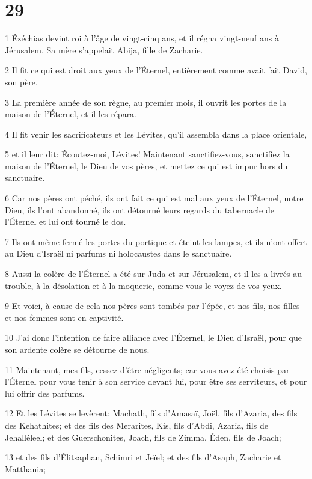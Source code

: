 \chapter{29}

\par 1 Ézéchias devint roi à l'âge de vingt-cinq ans, et il régna vingt-neuf ans à Jérusalem. Sa mère s'appelait Abija, fille de Zacharie.
\par 2 Il fit ce qui est droit aux yeux de l'Éternel, entièrement comme avait fait David, son père.
\par 3 La première année de son règne, au premier mois, il ouvrit les portes de la maison de l'Éternel, et il les répara.
\par 4 Il fit venir les sacrificateurs et les Lévites, qu'il assembla dans la place orientale,
\par 5 et il leur dit: Écoutez-moi, Lévites! Maintenant sanctifiez-vous, sanctifiez la maison de l'Éternel, le Dieu de vos pères, et mettez ce qui est impur hors du sanctuaire.
\par 6 Car nos pères ont péché, ils ont fait ce qui est mal aux yeux de l'Éternel, notre Dieu, ils l'ont abandonné, ils ont détourné leurs regards du tabernacle de l'Éternel et lui ont tourné le dos.
\par 7 Ils ont même fermé les portes du portique et éteint les lampes, et ils n'ont offert au Dieu d'Israël ni parfums ni holocaustes dans le sanctuaire.
\par 8 Aussi la colère de l'Éternel a été sur Juda et sur Jérusalem, et il les a livrés au trouble, à la désolation et à la moquerie, comme vous le voyez de vos yeux.
\par 9 Et voici, à cause de cela nos pères sont tombés par l'épée, et nos fils, nos filles et nos femmes sont en captivité.
\par 10 J'ai donc l'intention de faire alliance avec l'Éternel, le Dieu d'Israël, pour que son ardente colère se détourne de nous.
\par 11 Maintenant, mes fils, cessez d'être négligents; car vous avez été choisis par l'Éternel pour vous tenir à son service devant lui, pour être ses serviteurs, et pour lui offrir des parfums.
\par 12 Et les Lévites se levèrent: Machath, fils d'Amasaï, Joël, fils d'Azaria, des fils des Kehathites; et des fils des Merarites, Kis, fils d'Abdi, Azaria, fils de Jehalléleel; et des Guerschonites, Joach, fils de Zimma, Éden, fils de Joach;
\par 13 et des fils d'Élitsaphan, Schimri et Jeïel; et des fils d'Asaph, Zacharie et Matthania;
